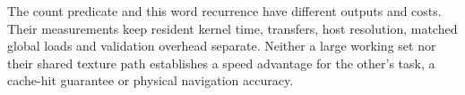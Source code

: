The count predicate and this word recurrence have different outputs and
costs. Their measurements keep resident kernel time, transfers, host
resolution, matched global loads and validation overhead separate. Neither a
large working set nor their shared texture path establishes a speed advantage
for the other's task, a cache-hit guarantee or physical navigation accuracy.

